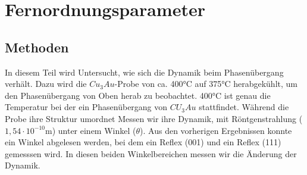 \documentclass[
	a4paper,
	12pt,
	pagesize,
	ngerman
]{scrartcl}
\begin{document}
\section{Fernordnungsparameter}
\subsection{Methoden}
In diesem Teil wird Untersucht, wie sich die Dynamik beim Phasenübergang verhält. Dazu wird die $Cu_3Au$-Probe von ca. 400°C auf 375°C herabgekühlt, um den Phasenübergang von Oben herab zu beobachtet. 400°C ist genau die Temperatur bei der ein Phasenübergang von $CU_3Au$ stattfindet. Während die Probe ihre Struktur umordnet Messen wir ihre Dynamik, mit Röntgenstrahlung ($1,54 \cdot 10^{-10}$m) unter einem Winkel ($\theta$). Aus den vorherigen Ergebnissen konnte ein Winkel abgelesen werden,
bei dem ein Reflex (001) und ein Reflex (111) gemesssen wird. In diesen beiden Winkelbereichen messen wir die Änderung der Dynamik.
\end{document}

